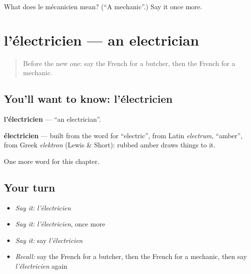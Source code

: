 \begin{tcolorbox}[breakable,colback=teal!4,colframe=teal!35!black,title={Before you move on}]
What does le mécanicien mean? (\textquotedblleft{}A mechanic\textquotedblright{}.) Say it once more.
\end{tcolorbox}
\section[l'électricien]{l'électricien — an electrician}

\label{lesson:FR-C196-electricien}



\begin{quote}
Before the new one: say the French for a butcher, then the French for a mechanic.
\end{quote}

\subsection*{You'll want to know: l'électricien}
\textbf{l'électricien} — \textquotedblleft{}an electrician\textquotedblright{}.

\begin{cousinweb}
\textbf{électricien} — built from the word for \textquotedblleft{}electric\textquotedblright{}, from Latin \emph{electrum}, \textquotedblleft{}amber\textquotedblright{}, from Greek \emph{elektron} (Lewis \& Short): rubbed amber draws things to it.
\end{cousinweb}

\begin{grammarlens}[title={What you've built}]
One more word for this chapter.
\end{grammarlens}

\subsection*{Your turn}
\begin{itemize}
\raggedright
  \item \emph{Say it:} \emph{l'électricien}
  \item \emph{Say it:} \emph{l'électricien}, once more
  \item \emph{Say it:} say \emph{l'électricien}
  \item \emph{Recall:} say the French for a butcher, then the French for a mechanic, then say \emph{l'électricien} again
\end{itemize}

